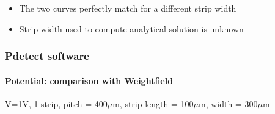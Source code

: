 \documentclass[14pt]{beamer}
\begin{document}
\begin{frame}
\begin{columns}
\begin{column}{0.5\textwidth}
      \end{column}
    \end{columns}

\begin{itemize}
  \item The two curves perfectly match for a different strip width
  \item Strip width used to compute analytical solution is unknown
\end{itemize}

\end{frame}

\begin{frame}
  \frametitle{Pdetect software}
  \framesubtitle{Potential: comparison with Weightfield}

  \fontsize{10pt}{7.2}\selectfont

  V=1V, 1 strip, pitch = 400$\mu$m, strip length = 100$\mu$m, width = 300$\mu$m

  \begin{columns}


\end{columns}
\end{frame}
\end{document}
